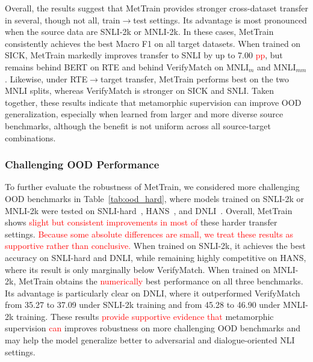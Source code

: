 \documentclass[lettersize,journal]{IEEEtran}
\newcommand{\red}[1]{\textcolor{red}{#1}}
\begin{document}
Overall, the results suggest that MetTrain provides stronger cross-dataset transfer in several, though not all, train$\rightarrow$test settings. Its advantage is most pronounced when the source data are SNLI-2k or MNLI-2k. In these cases, MetTrain consistently achieves the best Macro F1 on all target datasets. When trained on SICK, MetTrain markedly improves transfer to SNLI by up to 7.00 \red{pp}, but remains behind BERT on RTE and behind VerifyMatch on MNLI$_m$ and MNLI$_{mm}$. Likewise, under RTE$\rightarrow$target transfer, MetTrain performs best on the two MNLI splits, whereas VerifyMatch is stronger on SICK and SNLI. Taken together, these results indicate that metamorphic supervision can improve OOD generalization, especially when learned from larger and more diverse source benchmarks, although the benefit is not uniform across all source-target combinations.

\subsubsection{Challenging OOD Performance}

To further evaluate the robustness of MetTrain, we considered more challenging OOD benchmarks in Table~\ref{tab:ood_hard}, where models trained on SNLI-2k or MNLI-2k were tested on SNLI-hard~\cite{gururangan-etal-2018-annotation}, HANS~\cite{mccoy-etal-2019-right}, and DNLI~\cite{welleck-etal-2019-dialogue}. Overall, MetTrain shows \red{slight but consistent improvements in most of} these harder transfer settings. \red{Because some absolute differences are small, we treat these results as supportive rather than conclusive.} When trained on SNLI-2k, it achieves the best accuracy on SNLI-hard and DNLI, while remaining highly competitive on HANS, where its result is only marginally below VerifyMatch. When trained on MNLI-2k, MetTrain obtains the \red{numerically} best performance on all three benchmarks. Its advantage is particularly clear on DNLI, where it outperformed VerifyMatch from 35.27 to 37.09 under SNLI-2k training and from 45.28 to 46.90 under MNLI-2k training. These results \red{provide supportive evidence that} metamorphic supervision \red{can} improves robustness on more challenging OOD benchmarks and may help the model generalize better to adversarial and dialogue-oriented NLI settings.
\end{document}
